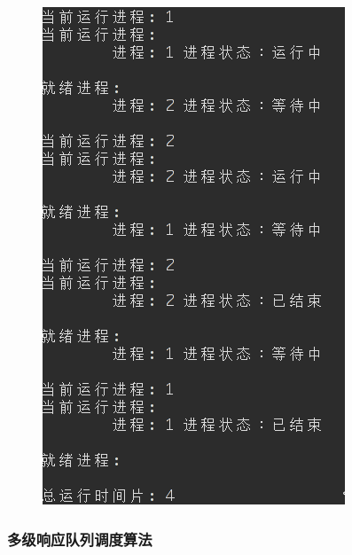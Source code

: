 \documentclass[12bp]{guo}
\begin{document}
\begin{figure}[h!]
    \centering
        \includegraphics[scale=0.75]{figures/1.priority.png}
\end{figure}

\clearpage

\subsubsection{多级响应队列调度算法}
\end{document}
